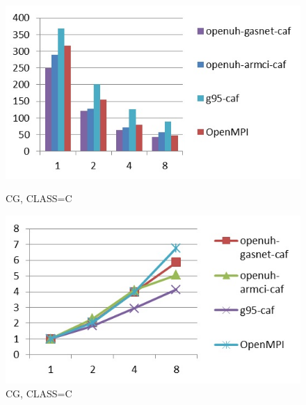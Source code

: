 \begin{figure}[ht]
\begin{minipage}[b]{0.45\linewidth}
\centering
\includegraphics[width=\textwidth]{./figures/cg_C_time.jpg}
\caption{CG, CLASS=C}
\label{fig:figure1}
\end{minipage}
\hspace{0.5cm}
\begin{minipage}[b]{0.45\linewidth}
\centering
\includegraphics[width=\textwidth]{./figures/cg_C_scalability.jpg}
\caption{CG, CLASS=C}
\label{fig:figure2}
\end{minipage}
\end{figure}


